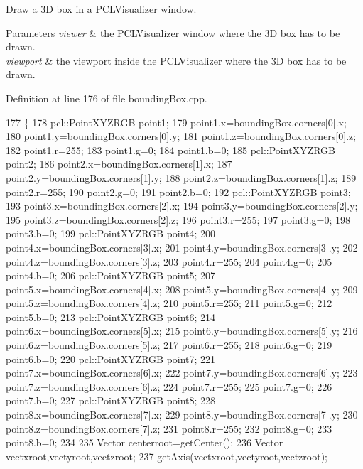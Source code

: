 Draw a 3\+D box in a P\+C\+L\+Visualizer window. 


\begin{DoxyParams}{Parameters}
{\em viewer} & the P\+C\+L\+Visualizer window where the 3\+D box has to be drawn. \\
\hline
{\em viewport} & the viewport inside the P\+C\+L\+Visualizer where the 3\+D box has to be drawn. \\
\hline
\end{DoxyParams}


Definition at line 176 of file bounding\+Box.\+cpp.


\begin{DoxyCode}
177 \{
178     pcl::PointXYZRGB point1;
179     point1.x=boundingBox.corners[0].x;
180     point1.y=boundingBox.corners[0].y;
181     point1.z=boundingBox.corners[0].z;
182     point1.r=255;
183     point1.g=0;
184     point1.b=0;
185     pcl::PointXYZRGB point2;
186     point2.x=boundingBox.corners[1].x;
187     point2.y=boundingBox.corners[1].y;
188     point2.z=boundingBox.corners[1].z;
189     point2.r=255;
190     point2.g=0;
191     point2.b=0;
192     pcl::PointXYZRGB point3;
193     point3.x=boundingBox.corners[2].x;
194     point3.y=boundingBox.corners[2].y;
195     point3.z=boundingBox.corners[2].z;
196     point3.r=255;
197     point3.g=0;
198     point3.b=0;
199     pcl::PointXYZRGB point4;
200     point4.x=boundingBox.corners[3].x;
201     point4.y=boundingBox.corners[3].y;
202     point4.z=boundingBox.corners[3].z;
203     point4.r=255;
204     point4.g=0;
205     point4.b=0;
206     pcl::PointXYZRGB point5;
207     point5.x=boundingBox.corners[4].x;
208     point5.y=boundingBox.corners[4].y;
209     point5.z=boundingBox.corners[4].z;
210     point5.r=255;
211     point5.g=0;
212     point5.b=0;
213     pcl::PointXYZRGB point6;
214     point6.x=boundingBox.corners[5].x;
215     point6.y=boundingBox.corners[5].y;
216     point6.z=boundingBox.corners[5].z;
217     point6.r=255;
218     point6.g=0;
219     point6.b=0;
220     pcl::PointXYZRGB point7;
221     point7.x=boundingBox.corners[6].x;
222     point7.y=boundingBox.corners[6].y;
223     point7.z=boundingBox.corners[6].z;
224     point7.r=255;
225     point7.g=0;
226     point7.b=0;
227     pcl::PointXYZRGB point8;
228     point8.x=boundingBox.corners[7].x;
229     point8.y=boundingBox.corners[7].y;
230     point8.z=boundingBox.corners[7].z;
231     point8.r=255;
232     point8.g=0;
233     point8.b=0;
234 
235     Vector centerroot=getCenter();
236     Vector vectxroot,vectyroot,vectzroot;
237     getAxis(vectxroot,vectyroot,vectzroot);

\end{DoxyCode}
